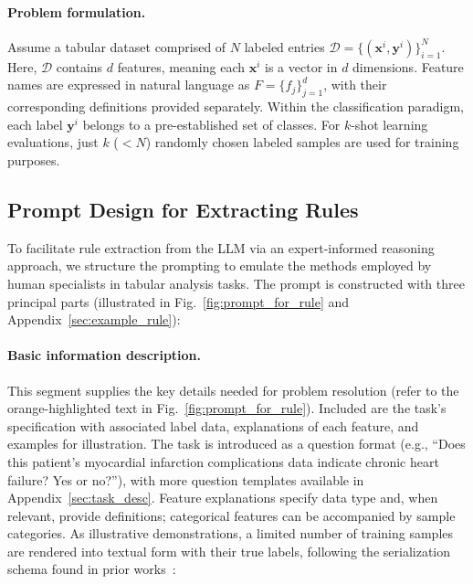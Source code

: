 \vspace*{-0.12in}
\paragraph{Problem formulation.} Assume a tabular dataset comprised of $N$ labeled entries $\mathcal{D} = \{(\mathbf{x}^i, \mathbf{y}^i)\}_{i=1}^{N}$. Here, $\mathcal{D}$ contains $d$ features, meaning each $\mathbf{x}^i$ is a vector in $d$ dimensions. Feature names are expressed in natural language as $F = \{f_j\}_{j=1}^{d}$, with their corresponding definitions provided separately. Within the classification paradigm, each label $\mathbf{y}^i$ belongs to a pre-established set of classes. For $k$-shot learning evaluations, just $k$ ($<N$) randomly chosen labeled samples are used for training purposes.

\subsection{Prompt Design for Extracting Rules}
\label{Sec:prompt_design}
To facilitate rule extraction from the LLM via an expert-informed reasoning approach, we structure the prompting to emulate the methods employed by human specialists in tabular analysis tasks. The prompt is constructed with three principal parts (illustrated in Fig.~\ref{fig:prompt_for_rule} and Appendix~\ref{sec:example_rule}):

\vspace*{-0.12in}
\paragraph{Basic information description.} This segment supplies the key details needed for problem resolution (refer to the orange-highlighted text in Fig.~\ref{fig:prompt_for_rule}). Included are the task’s specification with associated label data, explanations of each feature, and examples for illustration. The task is introduced as a question format (e.g., ``Does this patient's myocardial infarction complications data indicate chronic heart failure? Yes or no?''), with more question templates available in Appendix~\ref{sec:task_desc}. Feature explanations specify data type and, when relevant, provide definitions; categorical features can be accompanied by sample categories. As illustrative demonstrations, a limited number of training samples are rendered into textual form with their true labels, following the serialization schema found in prior works~\cite{dinh2022lift,hegselmann2023tabllm}:


